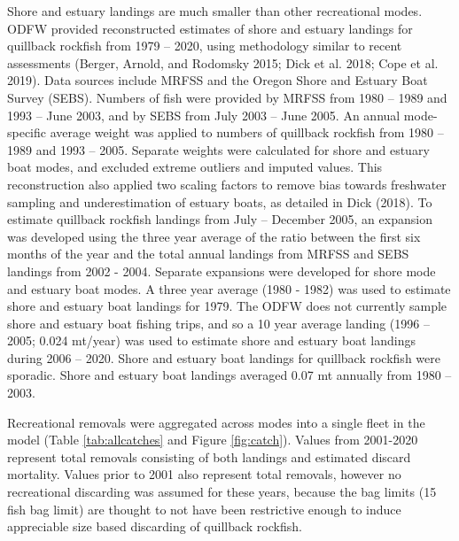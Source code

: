 \documentclass[11pt,
  english,
  a4paper,
]{article}
\begin{document}
Shore and estuary landings are much smaller than other recreational modes. ODFW provided reconstructed estimates of shore and estuary landings for quillback rockfish from 1979 -- 2020, using methodology similar to recent assessments {(Berger, Arnold, and Rodomsky 2015; Dick et al. 2018; Cope et al. 2019)\leavevmode\tagmcend\tagstructend}. Data sources include MRFSS and the Oregon Shore and Estuary Boat Survey (SEBS). Numbers of fish were provided by MRFSS from 1980 -- 1989 and 1993 -- June 2003, and by SEBS from July 2003 -- June 2005. An annual mode-specific average weight was applied to numbers of quillback rockfish from 1980 -- 1989 and 1993 -- 2005. Separate weights were calculated for shore and estuary boat modes, and excluded extreme outliers and imputed values. This reconstruction also applied two scaling factors to remove bias towards freshwater sampling and underestimation of estuary boats, as detailed in Dick {(2018)\leavevmode\tagmcend\tagstructend}. To estimate quillback rockfish landings from July -- December 2005, an expansion was developed using the three year average of the ratio between the first six months of the year and the total annual landings from MRFSS and SEBS landings from 2002 - 2004. Separate expansions were developed for shore mode and estuary boat modes. A three year average (1980 - 1982) was used to estimate shore and estuary boat landings for 1979. The ODFW does not currently sample shore and estuary boat fishing trips, and so a 10 year average landing (1996 -- 2005; 0.024 mt/year) was used to estimate shore and estuary boat landings during 2006 -- 2020. Shore and estuary boat landings for quillback rockfish were sporadic. Shore and estuary boat landings averaged 0.07 mt annually from 1980 -- 2003.

\leavevmode\tagmcend\tagstructend\par


Recreational removals were aggregated across modes into a single fleet in the model (Table \ref{tab:allcatches} and Figure \ref{fig:catch}). Values from 2001-2020 represent total removals consisting of both landings and estimated discard mortality. Values prior to 2001 also represent total removals, however no recreational discarding was assumed for these years, because the bag limits (15 fish bag limit) are thought to not have been restrictive enough to induce appreciable size based discarding of quillback rockfish.
\end{document}
